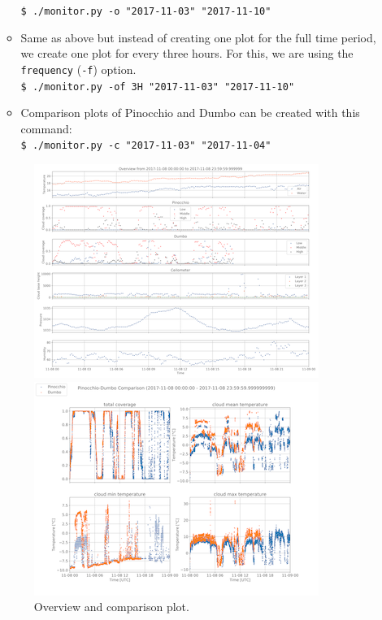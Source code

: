 \documentclass[11pt,a4paper]{article}
\begin{document}
\begin{enumerate}
\begin{itemize}
		\texttt{\$ ./monitor.py -o "2017-11-03" "2017-11-10" }
		\item Same as above but instead of creating one plot for the full time period, we create one plot for every three hours. For this, we are using the \texttt{frequency} (\texttt{-f}) option.\\
		\texttt{\$ ./monitor.py -of 3H "2017-11-03" "2017-11-10"}
		\item Comparison plots of Pinocchio and Dumbo can be created with this command:\\
		\texttt{\$ ./monitor.py -c "2017-11-03" "2017-11-04" }
	\end{itemize}
	\begin{figure}
	\centering
	\begin{minipage}{.5\textwidth}
  		\centering
  		\includegraphics[width=\linewidth]{figures/overview.png}
	\end{minipage}%
	\begin{minipage}{.5\textwidth}
  		\centering
  		\includegraphics[width=\linewidth]{figures/comparison.png}
	\end{minipage}
	\caption{Overview and comparison plot.}
	\label{fig:plots}
\end{figure}
	
\end{enumerate}
\end{document}
